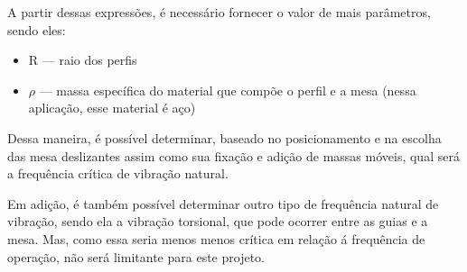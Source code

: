 A partir dessas expressões, é necessário fornecer o valor de mais parâmetros, sendo eles:
\begin{itemize}
    \item R --- raio dos perfis
    \item $\rho$ --- massa específica do material que compõe o perfil e a mesa (nessa aplicação, esse material é aço)
\end{itemize}


Dessa maneira, é possível determinar, baseado no posicionamento e na escolha das mesa deslizantes assim como sua fixação e adição de massas móveis, qual será a frequência crítica de vibração natural. 

Em adição, é também possível determinar outro tipo de frequência natural de vibração, sendo ela a vibração torsional, que pode ocorrer entre as guias e a mesa. Mas, como essa seria menos menos crítica em relação á frequência de operação, não será limitante para este projeto. 














